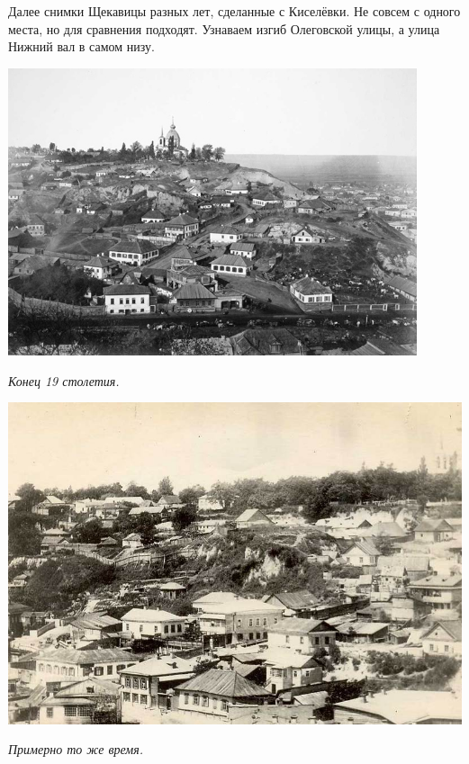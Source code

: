 Далее снимки Щекавицы разных лет, сделанные с Киселёвки. Не совсем с одного места, но для сравнения подходят. Узнаваем изгиб Олеговской улицы, а улица Нижний вал в самом низу.

\begin{center}
\includegraphics[width=0.90\textwidth]{chast-colebanie-osnov/sheka/sheka-19st-02.jpg}

\textit{Конец 19 столетия.}
\end{center}


\begin{center}
\includegraphics[width=0.90\linewidth]{chast-colebanie-osnov/sheka/sheka-19st-01.jpg}

\textit{Примерно то же время.}
\end{center}

\newpage



